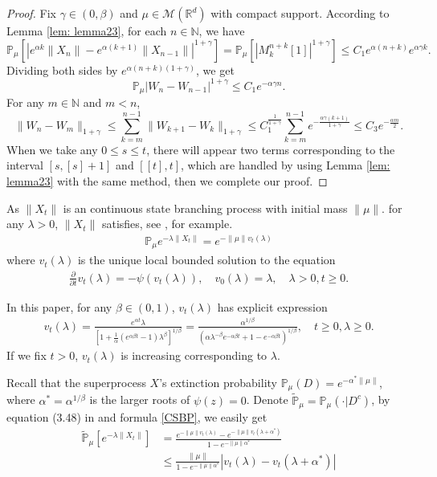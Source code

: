 \documentclass[12pt, a4paper]{amsart}
\theoremstyle{definition}
\numberwithin{equation}{section}
\begin{document}
\begin{proof}
    Fix $\gamma \in (0,\beta)$ and $\mu\in \mathcal M(\mathbb R^d)$ with compact support.
    According to Lemma \ref{lem: lemma23}, for each $n \in \mathbb N$, we have
    $$ \mathbb{P}_{\mu}[|e^{\alpha k}\|X_n\|-e^{\alpha(k+1)}\|X_{n-1}\||^{1+\gamma}]
    = \mathbb P_\mu [|M^{n+k}_k[1]|^{1+\gamma}]
    \leq C_1 e^{\alpha(n+k)}e^{\alpha\gamma k}.$$
    Dividing both sides by $e^{\alpha(n+k)(1+\gamma)}$, we get
    $$\mathbb{P}_{\mu}\left|W_n-W_{n-1}\right|^{1+\gamma}\leq C_1 e^{-\alpha \gamma n}.$$
    For any $m\in \mathbb{N}$ and $m<n$,
    $$\|W_n-W_m\|_{1+\gamma}\leq \sum_{k=m}^{n-1}\|W_{k+1}-W_k\|_{1+\gamma}\leq C_1^{\frac{1}{1+\gamma}}\sum_{k=m}^{n-1}e^{-\frac{\alpha\gamma(k+1)}{1+\gamma}}\leq C_3 e^{-\frac{\alpha m}{2}}.$$
 When we take any $0\leq s\leq t$, there will appear two terms corresponding to the interval $[s,[s]+1]$ and $[[t],t]$, which are  handled by using Lemma \ref{lem: lemma23} with the same method, then we complete our proof.
\end{proof}
As $\|X_t\|$ is an continuous state branching process with initial mass $\|\mu\|$.
for any $\lambda>0$, $\|X_t\|$ satisfies, see \cite[Chapter 3]{Li2011Measure-valued}, for example.
\begin{align}\label{CSBP}
    \mathbb{P}_{\mu}e^{-\lambda\|X_t\|}=e^{-\|\mu\|v_t(\lambda)}
\end{align}
where $v_t(\lambda)$ is the unique local bounded solution to the equation
\begin{align*}
    \frac{\partial}{\partial t}v_t(\lambda)=-\psi(v_t(\lambda)), \quad  v_0(\lambda)=\lambda,  \quad \lambda>0, t\geq 0.
\end{align*}

In this paper, for any $\beta\in (0,1)$, $v_t(\lambda)$ has explicit expression \cite[Example 3.1]{Li2011Measure-valued}
\begin{align*}
    v_t(\lambda)=\frac{e^{\alpha t} \lambda}{[1+\frac{1}{\alpha}(e^{\alpha \beta t}-1)\lambda^{\beta}]^{1/\beta}}=\frac{\alpha^{1/\beta}}{(\alpha\lambda^{-\beta}e^{-\alpha \beta t}+1-e^{-\alpha \beta t})^{1/\beta}},\quad t\geq 0,\lambda\geq 0.
\end{align*}
If we fix $t>0$, $v_t(\lambda)$ is increasing corresponding to $\lambda$.

Recall that the superprocess $X$'s extinction probability $\mathbb{P}_{\mu}(D)=e^{-\alpha^*\|\mu\|}$, where $\alpha^*=\alpha^{1/\beta}$ is the larger roots of $\psi(z)=0$. Denote $\mathbb{\tilde{P}}_{\mu}=\mathbb{P}_{\mu}(\cdot|D^c)$, by equation (3.48) in\cite{Li2011Measure-valued} and formula \eqref{CSBP}, we easily get
\begin{align}
    \mathbb{\tilde{P}}_{\mu}[e^{-\lambda \|X_t\|}]&=\frac{e^{-\|\mu\|v_t(\lambda)}-e^{-\|\mu\|v_t(\lambda+\alpha^*)}}{1-e^{-\|\mu\|\alpha^*}}\nonumber\\
        &\leq \frac{\|\mu\|}{1-e^{-\|\mu\|\alpha^*}}\left|v_t(\lambda)-v_t(\lambda+\alpha^*)\right| \label{laplaceexpress}
\end{align}
\end{document}
